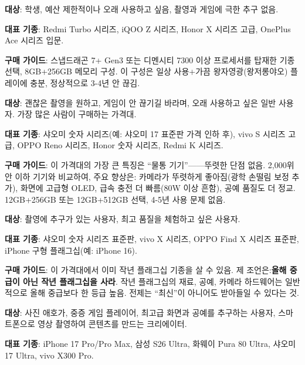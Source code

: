 
\textbf{대상}: 학생, 예산 제한적이나 오래 사용하고 싶음, 촬영과 게임에 극한 추구 없음.

\textbf{대표 기종}: Redmi Turbo 시리즈, iQOO Z 시리즈, Honor X 시리즈 고급, OnePlus Ace 시리즈 입문.

\textbf{구매 가이드}: 스냅드래곤 7+ Gen3 또는 디멘시티 7300 이상 프로세서를 탑재한 기종 선택, 8GB+256GB 메모리 구성. 이 구성은 일상 사용+가끔 왕자영광(왕저롱야오) 플레이에 충분, 정상적으로 3-4년 안 끊김.


\textbf{대상}: 괜찮은 촬영을 원하고, 게임이 안 끊기길 바라며, 오래 사용하고 싶은 일반 사용자. 가장 많은 사람이 구매하는 가격대.

\textbf{대표 기종}: 샤오미 숫자 시리즈(예: 샤오미 17 표준판 가격 인하 후), vivo S 시리즈 고급, OPPO Reno 시리즈, Honor 숫자 시리즈, Redmi K 시리즈.

\textbf{구매 가이드}: 이 가격대의 가장 큰 특징은 “물통 기기”——뚜렷한 단점 없음. 2,000위안 이하 기기와 비교하여, 주요 향상은: 카메라가 뚜렷하게 좋아짐(광학 손떨림 보정 추가), 화면에 고급형 OLED, 급속 충전 더 빠름(80W 이상 흔함), 공예 품질도 더 정교. 12GB+256GB 또는 12GB+512GB 선택, 4-5년 사용 문제 없음.


\textbf{대상}: 촬영에 추구가 있는 사용자, 최고 품질을 체험하고 싶은 사용자.

\textbf{대표 기종}: 샤오미 숫자 시리즈 표준판, vivo X 시리즈, OPPO Find X 시리즈 표준판, iPhone 구형 플래그십(예: iPhone 16).

\textbf{구매 가이드}: 이 가격대에서 이미 작년 플래그십 기종을 살 수 있음. 제 조언은:\textbf{올해 중급이 아닌 작년 플래그십을 사라}. 작년 플래그십의 재료, 공예, 카메라 하드웨어는 일반적으로 올해 중급보다 한 등급 높음. 전제는 “최신”이 아니어도 받아들일 수 있다는 것.


\textbf{대상}: 사진 애호가, 중증 게임 플레이어, 최고급 화면과 공예를 추구하는 사용자, 스마트폰으로 영상 촬영하여 콘텐츠를 만드는 크리에이터.

\textbf{대표 기종}: iPhone 17 Pro/Pro Max, 삼성 S26 Ultra, 화웨이 Pura 80 Ultra, 샤오미 17 Ultra, vivo X300 Pro.

